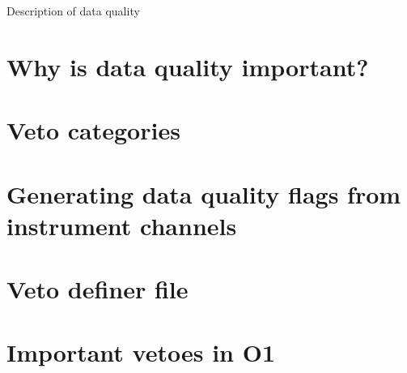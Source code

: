 Description of data quality 

\section{Why is data quality important?}

\section{Veto categories}

\section{Generating data quality flags from instrument channels}

\section{Veto definer file}

\section{Important vetoes in O1}


